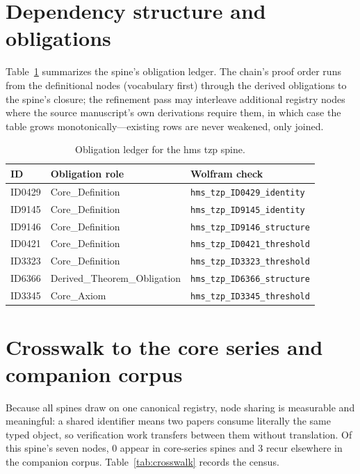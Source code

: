 \documentclass[11pt]{article}
\theoremstyle{remark}
\begin{document}
\section{Dependency structure and obligations}
\label{sec:dep}

Table~\ref{tab:obligations} summarizes the spine's obligation ledger. The chain's proof order runs from the definitional nodes (vocabulary first) through the derived obligations to the spine's closure; the refinement pass may interleave additional registry nodes where the source manuscript's own derivations require them, in which case the table grows monotonically---existing rows are never weakened, only joined.

\begin{table}[ht]
\centering
\small
\caption{Obligation ledger for the hms tzp spine.}
\label{tab:obligations}
\begin{tabular}{llp{6.2cm}}
\toprule
ID & Obligation role & Wolfram check \\
\midrule
ID0429 & Core\_Definition & \texttt{hms\_tzp\_ID0429\_identity} \\
ID9145 & Core\_Definition & \texttt{hms\_tzp\_ID9145\_identity} \\
ID9146 & Core\_Definition & \texttt{hms\_tzp\_ID9146\_structure} \\
ID0421 & Core\_Definition & \texttt{hms\_tzp\_ID0421\_threshold} \\
ID3323 & Core\_Definition & \texttt{hms\_tzp\_ID3323\_threshold} \\
ID6366 & Derived\_Theorem\_Obligation & \texttt{hms\_tzp\_ID6366\_structure} \\
ID3345 & Core\_Axiom & \texttt{hms\_tzp\_ID3345\_threshold} \\
\bottomrule
\end{tabular}
\end{table}

\section{Crosswalk to the core series and companion corpus}
\label{sec:crosswalk}

Because all spines draw on one canonical registry, node sharing is measurable and meaningful: a shared identifier means two papers consume literally the same typed object, so verification work transfers between them without translation. Of this spine's seven nodes, 0 appear in core-series spines and 3 recur elsewhere in the companion corpus. Table~\ref{tab:crosswalk} records the census.
\end{document}

